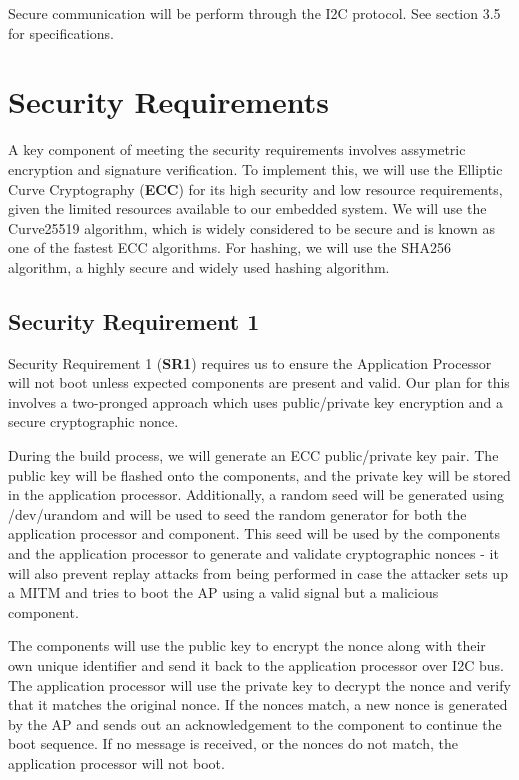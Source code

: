 \documentclass{prace}
\begin{document}
Secure communication will be perform through the I2C protocol. See section 3.5 for specifications.

\section{Security Requirements}

A key component of meeting the security requirements involves assymetric encryption and signature
verification. To implement this, we will use the Elliptic Curve Cryptography (\textbf{ECC}) for
its high security and low resource requirements, given the limited resources available to our
embedded system. We will use the Curve25519 algorithm, which is widely considered to be secure
and is known as one of the fastest ECC algorithms. For hashing, we will use the SHA256 algorithm,
a highly secure and widely used hashing algorithm.

\subsection{Security Requirement 1}
Security Requirement 1 (\textbf{SR1}) requires us to ensure the Application Processor will not boot unless
expected components are present and valid. Our plan for this involves a two-pronged approach
which uses public/private key encryption and a secure cryptographic nonce.

During the build process, we will generate an ECC public/private key pair. The public key will be
flashed onto the components, and the private key will be stored in the application processor.
Additionally, a random seed will be generated using /dev/urandom and will be used to seed the
random generator for both the application processor and component. This seed will be used by the components and the application processor to generate
and validate cryptographic nonces - it will also prevent replay attacks from being performed in case the attacker sets up a MITM and tries to boot the AP using a valid signal but a malicious component.

The components will use the public key to encrypt the nonce along with their own
unique identifier and send it back to the application processor over I2C bus. The application
processor will use the private key to decrypt the nonce and verify that it matches the original
nonce. If the nonces match, a new nonce is generated by the AP and sends out an acknowledgement to the component to continue the boot sequence. If no message is received, or the nonces do not match, the application
processor will not boot.
\end{document}
